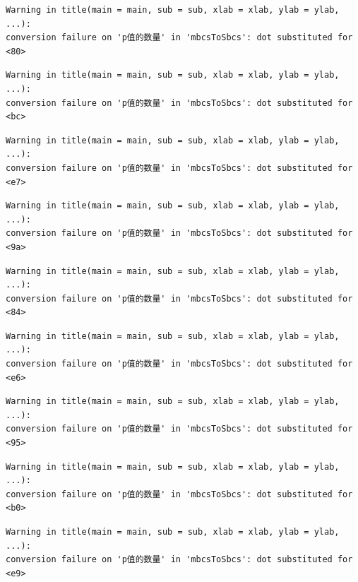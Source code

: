 \documentclass[
  letterpaper,
  DIV=11,
  numbers=noendperiod]{scrreprt}
\begin{document}
\begin{verbatim}
Warning in title(main = main, sub = sub, xlab = xlab, ylab = ylab, ...):
conversion failure on 'p值的数量' in 'mbcsToSbcs': dot substituted for <80>
\end{verbatim}

\begin{verbatim}
Warning in title(main = main, sub = sub, xlab = xlab, ylab = ylab, ...):
conversion failure on 'p值的数量' in 'mbcsToSbcs': dot substituted for <bc>
\end{verbatim}

\begin{verbatim}
Warning in title(main = main, sub = sub, xlab = xlab, ylab = ylab, ...):
conversion failure on 'p值的数量' in 'mbcsToSbcs': dot substituted for <e7>
\end{verbatim}

\begin{verbatim}
Warning in title(main = main, sub = sub, xlab = xlab, ylab = ylab, ...):
conversion failure on 'p值的数量' in 'mbcsToSbcs': dot substituted for <9a>
\end{verbatim}

\begin{verbatim}
Warning in title(main = main, sub = sub, xlab = xlab, ylab = ylab, ...):
conversion failure on 'p值的数量' in 'mbcsToSbcs': dot substituted for <84>
\end{verbatim}

\begin{verbatim}
Warning in title(main = main, sub = sub, xlab = xlab, ylab = ylab, ...):
conversion failure on 'p值的数量' in 'mbcsToSbcs': dot substituted for <e6>
\end{verbatim}

\begin{verbatim}
Warning in title(main = main, sub = sub, xlab = xlab, ylab = ylab, ...):
conversion failure on 'p值的数量' in 'mbcsToSbcs': dot substituted for <95>
\end{verbatim}

\begin{verbatim}
Warning in title(main = main, sub = sub, xlab = xlab, ylab = ylab, ...):
conversion failure on 'p值的数量' in 'mbcsToSbcs': dot substituted for <b0>
\end{verbatim}

\begin{verbatim}
Warning in title(main = main, sub = sub, xlab = xlab, ylab = ylab, ...):
conversion failure on 'p值的数量' in 'mbcsToSbcs': dot substituted for <e9>
\end{verbatim}
\end{document}
